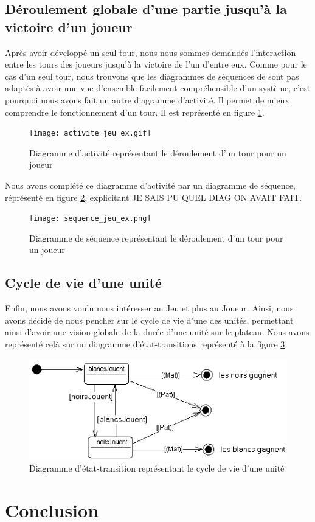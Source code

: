 \documentclass[12pt]{article}
\begin{document}
\subsection{Déroulement globale d'une partie jusqu'à la victoire d'un joueur}
Après avoir développé un seul tour, nous nous sommes demandés l'interaction entre les tours des joueurs jusqu'à la victoire de l'un d'entre eux. Comme pour le cas d'un seul tour, nous trouvons que les diagrammes de séquences de sont pas adaptés à avoir une vue d'ensemble facilement compréhensible d'un système, c'est pourquoi nous avons fait un autre diagramme d'activité. Il permet de mieux comprendre le fonctionnement d'un tour. Il est représenté en figure \ref{activiteJeu}.

\begin{figure}[!h] 
\centerline{\texttt{[image: activite\_jeu\_ex.gif]}}
   \caption{\label{étiquette} Diagramme d'activité représentant le déroulement d'un tour pour un joueur}
\label{activiteJeu}
\end{figure}

Nous avons complété ce diagramme d'activité par un diagramme de séquence, réprésenté en figure \ref{sequenceJeu}, explicitant JE SAIS PU QUEL DIAG ON AVAIT FAIT.

\begin{figure}[!h] 
\centerline{\texttt{[image: sequence\_jeu\_ex.png]}}
   \caption{\label{étiquette} Diagramme de séquence représentant le déroulement d'un tour pour un joueur}
\label{sequenceJeu}
\end{figure}

\subsection{Cycle de vie d'une unité}
Enfin, nous avons voulu nous intéresser au Jeu et plus au Joueur. Ainsi, nous avons décidé de nous pencher sur le cycle de vie d'une des unités, permettant ainsi d'avoir une vision globale de la durée d'une unité sur le plateau. Nous avons représenté celà sur un diagramme d'état-transitions représenté à la figure \ref{etata}

\begin{figure}[!h] 
\centerline{\includegraphics[scale=0.60]{etata_ex.gif}}
   \caption{\label{étiquette} Diagramme d'état-transition représentant le cycle de vie d'une unité}
\label{etata}
\end{figure}
\newpage

\section{Conclusion}

\newpage



\end{document}
